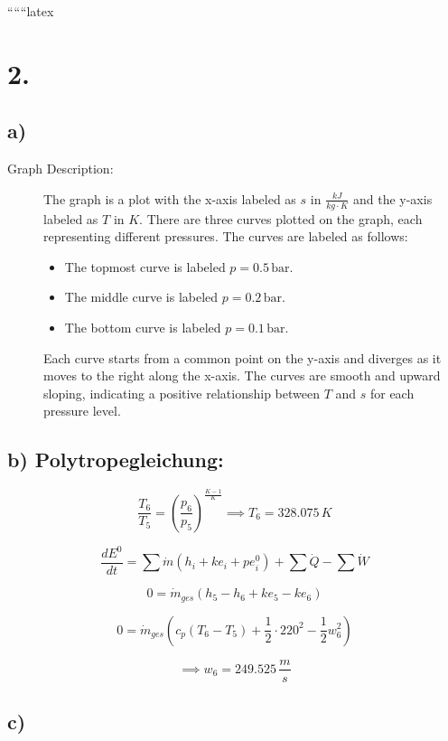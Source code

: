 
``````latex


\section*{2.}

\subsection*{a)}

\begin{description}
    \item[Graph Description:] The graph is a plot with the x-axis labeled as $s$ in $\frac{kJ}{kg \cdot K}$ and the y-axis labeled as $T$ in $K$. There are three curves plotted on the graph, each representing different pressures. The curves are labeled as follows:
    \begin{itemize}
        \item The topmost curve is labeled $p = 0.5 \, \text{bar}$.
        \item The middle curve is labeled $p = 0.2 \, \text{bar}$.
        \item The bottom curve is labeled $p = 0.1 \, \text{bar}$.
    \end{itemize}
    Each curve starts from a common point on the y-axis and diverges as it moves to the right along the x-axis. The curves are smooth and upward sloping, indicating a positive relationship between $T$ and $s$ for each pressure level.
\end{description}

\subsection*{b) Polytropegleichung:}

\[
\frac{T_6}{T_5} = \left( \frac{p_6}{p_5} \right)^{\frac{K-1}{K}} \implies T_6 = 328.075 \, K
\]

\[
\frac{dE^0}{dt} = \sum \dot{m} (h_i + ke_i + pe_i^0) + \sum \dot{Q} - \sum \dot{W}
\]

\[
0 = \dot{m}_{ges} (h_5 - h_6 + ke_5 - ke_6)
\]

\[
0 = \dot{m}_{ges} \left( c_p \left( T_6 - T_5 \right) + \frac{1}{2} \cdot 220^2 - \frac{1}{2} w_6^2 \right)
\]

\[
\implies w_6 = 249.525 \, \frac{m}{s}
\]

\subsection*{c)}

